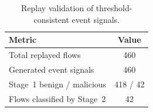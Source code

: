 \begin{table}[t]
  \centering
  \caption{Replay validation of threshold-consistent event signals.}
  \label{tab:exp-replay}
  \begin{tabular}{@{}lc@{}}
    \toprule
    Metric & Value \\
    \midrule
    Total replayed flows & 460 \\
    Generated event signals & 460 \\
    Stage~1 benign / malicious & 418 / 42 \\
    Flows classified by Stage~2 & 42 \\
    \bottomrule
  \end{tabular}
\end{table}
